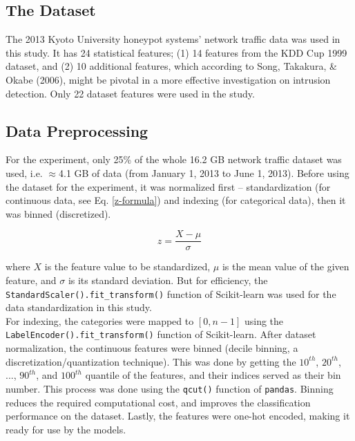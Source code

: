 \subsection{The Dataset}
The 2013 Kyoto University honeypot systems' network traffic data\cite{Song} was used in this study. It has 24 statistical features\cite{Song}; (1) 14 features from the KDD Cup 1999 dataset\cite{Stolfo}, and (2) 10 additional features, which according to Song, Takakura, \& Okabe (2006)\cite{Song}, might be pivotal in a more effective investigation on intrusion detection. Only 22 dataset features were used in the study.

\subsection{Data Preprocessing}

For the experiment, only 25\% of the whole 16.2 GB network traffic dataset was used, i.e. $\approx$4.1 GB of data (from January 1, 2013 to June 1, 2013). Before using the dataset for the experiment, it was normalized first -- standardization (for continuous data, see Eq. \ref{z-formula}) and indexing (for categorical data), then it was binned (discretized).

\begin{equation}\label{z-formula}
z = \dfrac{X - \mu}{\sigma}
\end{equation}

\indent	where $X$ is the feature value to be standardized, $\mu$ is the mean value of the given feature, and $\sigma$ is its standard deviation. But for efficiency, the \texttt{StandardScaler().fit\_transform()} function of Scikit-learn\cite{scikit-learn} was used for the data standardization in this study.\\
\indent	For indexing, the categories were mapped to $[0, n-1]$ using the \texttt{LabelEncoder().fit\_transform()} function of Scikit-learn\cite{scikit-learn}.
\indent	After dataset normalization, the continuous features were binned (decile binning, a discretization/quantization technique). This was done by getting the $10^{th}$, $20^{th}$, ..., $90^{th}$, and $100^{th}$ quantile of the features, and their indices served as their bin number. This process was done using the \texttt{qcut()} function of \texttt{pandas}\cite{mckinney-proc-scipy-2010}. Binning reduces the required computational cost, and improves the classification performance on the dataset\cite{lustgarten2008improving}. Lastly, the features were one-hot encoded, making it ready for use by the models.

